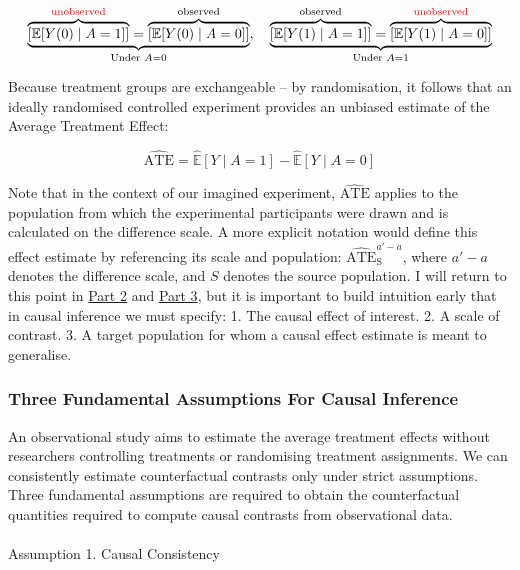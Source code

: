 \documentclass[
  single column]{article}
\makeatletter
\let\oldparagraph\paragraph
\renewcommand{\paragraph}{
    \@ifstar
      \xxxParagraphStar
      \xxxParagraphNoStar
  }
\newcommand{\xxxParagraphStar}[1]{\oldparagraph*{#1}\mbox{}}
\newcommand{\xxxParagraphNoStar}[1]{\oldparagraph{#1}\mbox{}}
\makeatother
\begin{document}
\[
\underbrace{\overbrace{\left[\mathbb{E}[Y(0) \mid A = 1]\right]}^{\textcolor{red}{\text{unobserved}}} = \overbrace{\left[\mathbb{E}[Y(0) \mid A = 0]\right]}^{\text{observed}}}_{\text{Under } A = 0}, \quad \underbrace{\overbrace{\left[\mathbb{E}[Y(1) \mid A = 1]\right]}^{\text{observed}} = \overbrace{\left[\mathbb{E}[Y(1) \mid A = 0]\right]}^{\textcolor{red}{\text{unobserved}}}}_{\text{Under } A = 1}
\]

Because treatment groups are exchangeable -- by randomisation, it
follows that an ideally randomised controlled experiment provides an
unbiased estimate of the Average Treatment Effect:

\[
\widehat{\text{ATE}} = \widehat{\mathbb{E}}[Y \mid A = 1] - \widehat{\mathbb{E}}[Y \mid A = 0]
\]

Note that in the context of our imagined experiment,
\(\widehat{\text{ATE}}\) applies to the population from which the
experimental participants were drawn and is calculated on the difference
scale. A more explicit notation would define this effect estimate by
referencing its scale and population:
\(\widehat{\text{ATE}}^{a'-a}_{\text{S}}\), where \(a'-a\) denotes the
difference scale, and \(S\) denotes the source population. I will return
to this point in \hyperref[id-sec-2]{Part 2} and
\hyperref[id-sec-3]{Part 3}, but it is important to build intuition
early that in causal inference we must specify: 1. The causal effect of
interest. 2. A scale of contrast. 3. A target population for whom a
causal effect estimate is meant to generalise.

\subsubsection{Three Fundamental Assumptions For Causal
Inference}\label{three-fundamental-assumptions-for-causal-inference}

An observational study aims to estimate the average treatment effects
without researchers controlling treatments or randomising treatment
assignments. We can consistently estimate counterfactual contrasts only
under strict assumptions. Three fundamental assumptions are required to
obtain the counterfactual quantities required to compute causal
contrasts from observational data.

\paragraph{Assumption 1. Causal
Consistency}\label{assumption-1.-causal-consistency}
\end{document}
